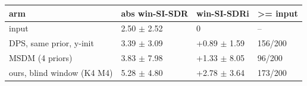 \begin{tabular}{llll}
\toprule
arm & abs win-SI-SDR & win-SI-SDRi & >= input\\
\midrule
input & 2.50 $\pm$ 2.52 & 0 & --\\
DPS, same prior, y-init & 3.39 $\pm$ 3.09 & +0.89 $\pm$ 1.59 & 156/200\\
MSDM (4 priors) & 3.83 $\pm$ 7.98 & +1.33 $\pm$ 8.05 & 96/200\\
ours, blind window (K4 M4) & 5.28 $\pm$ 4.80 & +2.78 $\pm$ 3.64 & 173/200\\
\bottomrule
\end{tabular}
